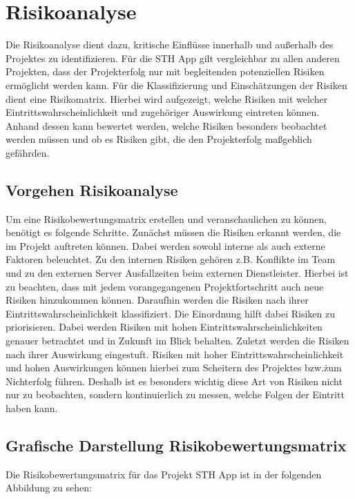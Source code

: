 \chapter{Risikoanalyse}

Die Risikoanalyse dient dazu, kritische Einflüsse innerhalb und außerhalb des Projektes zu identifizieren.
Für die STH App gilt vergleichbar zu allen anderen Projekten, dass der Projekterfolg nur mit begleitenden potenziellen Risiken ermöglicht werden kann.
Für die Klassifizierung und Einschätzungen der Risiken dient eine Risikomatrix. Hierbei wird aufgezeigt, welche Risiken mit welcher Eintrittswahrscheinlichkeit und zugehöriger Auswirkung eintreten können.
Anhand dessen kann bewertet werden, welche Risiken besonders beobachtet werden müssen und ob es Risiken gibt, die den Projekterfolg maßgeblich gefährden.

\section{Vorgehen Risikoanalyse}
Um eine Risikobewertungsmatrix erstellen und veranschaulichen zu können, benötigt es folgende Schritte.
Zunächst müssen die Risiken erkannt werden, die im Projekt auftreten können.
Dabei werden sowohl interne als auch externe Faktoren beleuchtet.
Zu den internen Risiken gehören z.B. Konflikte im Team und zu den externen Server Ausfallzeiten beim externen Dienstleister.
Hierbei ist zu beachten, dass mit jedem vorangegangenen Projektfortschritt auch neue Risiken hinzukommen können.
Daraufhin werden die Risiken nach ihrer Eintrittswahrscheinlichkeit klassifiziert.
Die Einordnung hilft dabei Risiken zu priorisieren.
Dabei werden Risiken mit hohen Eintrittswahrscheinlichkeiten genauer betrachtet und in Zukunft im Blick behalten.
Zuletzt werden die Risiken nach ihrer Auswirkung eingestuft.
Risiken mit hoher Eintrittswahrscheinlichkeit und hohen Auswirkungen können hierbei zum Scheitern des Projektes bzw.\. zum Nichterfolg führen.
Deshalb ist es besonders wichtig diese Art von Risiken nicht nur zu beobachten, sondern kontinuierlich zu messen, welche Folgen der Eintritt haben kann.

\newpage
\section{Grafische Darstellung Risikobewertungsmatrix}
Die Risikobewertungsmatrix für das Projekt STH App ist in der folgenden Abbildung zu sehen:

